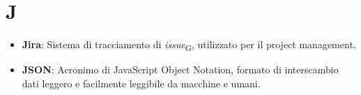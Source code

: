 \section{J}
\begin{itemize}
    \item \textbf{Jira}: Sistema di tracciamento di \textit{issue}\textsubscript{G}, utilizzato per il project management.
    \item \textbf{JSON}: Acronimo di JavaScript Object Notation, formato di interscambio dati leggero e facilmente leggibile da macchine e umani.
\end{itemize}
